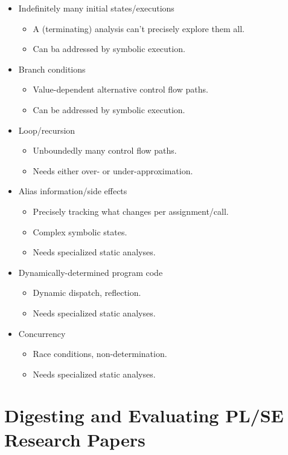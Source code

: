 \documentclass{article}
\begin{document}
\begin{itemize}
    \item Indefinitely many initial states/executions
    \begin{itemize}
        \item A (terminating) analysis can't precisely explore them all.
        \item Can ba addressed by symbolic execution.
    \end{itemize}
    \item Branch conditions
    \begin{itemize}
        \item Value-dependent alternative control ﬂow paths.
        \item Can be addressed by symbolic execution.
    \end{itemize}
    \item Loop/recursion
    \begin{itemize}
        \item Unboundedly many control ﬂow paths.
        \item Needs either over- or under-approximation.
    \end{itemize}
    \item Alias information/side effects
    \begin{itemize}
        \item Precisely tracking what changes per assignment/call.
        \item Complex symbolic states.
        \item Needs specialized static analyses.
    \end{itemize}
    \item Dynamically-determined program code
    \begin{itemize}
        \item Dynamic dispatch, reflection.
        \item Needs specialized static analyses.
    \end{itemize}
    \item Concurrency
    \begin{itemize}
        \item Race conditions, non-determination.
        \item Needs specialized static analyses.
    \end{itemize}
\end{itemize}

\section{Digesting and Evaluating PL/SE Research Papers}
\end{document}
